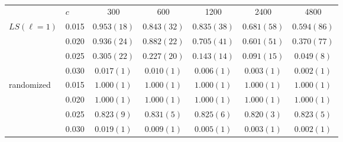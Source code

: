 
\begin{table}[t]
\caption{}
\label{tab:finitesize}
\begin{ruledtabular}
\begin{tabular}{llccccc}
 & $c$ & 300 & 600 & 1200 & 2400 & 4800 \\
\colrule
$LS(\ell=1)$ & 0.015 & $0.953(18)$ & $0.843(32)$ & $0.835(38)$ & $0.681(58)$ & $0.594(86)$ \\
 & 0.020 & $0.936(24)$ & $0.882(22)$ & $0.705(41)$ & $0.601(51)$ & $0.370(77)$ \\
 & 0.025 & $0.305(22)$ & $0.227(20)$ & $0.143(14)$ & $0.091(15)$ & $0.049(8)$ \\
 & 0.030 & $0.017(1)$ & $0.010(1)$ & $0.006(1)$ & $0.003(1)$ & $0.002(1)$ \\
\colrule
randomized & 0.015 & $1.000(1)$ & $1.000(1)$ & $1.000(1)$ & $1.000(1)$ & $1.000(1)$ \\
 & 0.020 & $1.000(1)$ & $1.000(1)$ & $1.000(1)$ & $1.000(1)$ & $1.000(1)$ \\
 & 0.025 & $0.823(9)$ & $0.831(5)$ & $0.825(6)$ & $0.820(3)$ & $0.823(5)$ \\
 & 0.030 & $0.019(1)$ & $0.009(1)$ & $0.005(1)$ & $0.003(1)$ & $0.002(1)$ \\
\end{tabular}
\end{ruledtabular}
\end{table}
